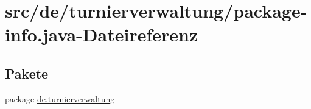 \hypertarget{package-info_8java}{}\section{src/de/turnierverwaltung/package-\/info.java-\/\+Dateireferenz}
\label{package-info_8java}
\subsection*{Pakete}
\begin{DoxyCompactItemize}
\item 
package \hyperlink{namespacede_1_1turnierverwaltung}{de.\+turnierverwaltung}
\end{DoxyCompactItemize}
